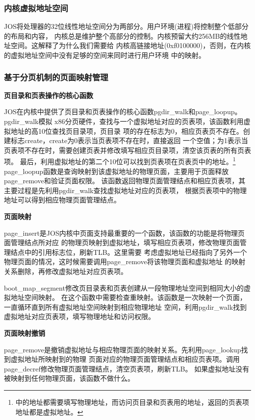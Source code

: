 \documentclass[12pt,openany,a4paper]{report}
\begin{document}
	    \subsubsection{内核虚拟地址空间}
	    JOS将处理器的32位线性地址空间分为两部分。用户环境(进程)将控制整个低部分的布局和内容，
	内核总是维护整个高部分的控制。内核预留大约256MB的线性地址空间。这解释了为什么我们需要给
	内核高链接地址(0xf0100000)，否则，在内核的虚拟地址空间中没有足够的空间来同时进行用户环境
	中的映射。\par
	\subsubsection{基于分页机制的页面映射管理}
	\textbf{页目录和页表操作的核心函数}\par
	    JOS在内核中提供了页目录和页表操作的核心函数pgdir\_walk和page\_loopup。pgdir\_walk模拟
	x86分页硬件，查找与一个虚拟地址对应的页表项，该函数利用虚拟地址的高10位查找页目录项，页目录
	项的存在标志为0，相应页表页不存在。创建标志create，create为0表示当页表项不存在时，直接返回
	一个空值；为1表示当页表项不存在时，需要创建页表并修改填写相应页目录项，清空该页表的所有页表项。
	最后，利用虚拟地址的第二个10位可以找到页表项在页表页中的地址。\footnote{
	中的地址都需要填写物理地址，而访问页目录和页表用的地址，返回的页表项地址都是虚拟地址。}
	page\_loopup函数是查询映射到该虚拟地址的物理页面，主要用于页面释放page\_remove和验证页面权限。
	该函数返回物理页面管理结点和相应页表项，其主要过程是先利用pgdir\_walk查找虚拟地址对应的页表项，
	根据页表项中的物理地址可以得到相应物理页面管理结点。\par
	\textbf{页面映射}\par
	    page\_insert是JOS内核中页面支持最重要的一个函数，该函数的功能是将物理页面管理结点所对应
	的物理页映射到虚拟地址，填写相应页表项，修改物理页面管理结点中的引用标志位，刷新TLB。这里需要
	考虑虚拟地址已经指向了另外一个物理页面的情况，这时候需要调用page\_remove将该物理页面和虚拟地址
	的映射关系删除，再修改虚拟地址对应页表项。\par
	    boot\_map\_segment修改页目录表和页表创建从一段物理地址空间到相同大小的虚拟地址空间映射。
	在这个函数中需要检查重映射。该函数是一次映射一个页面，一直循环直到所有虚拟地址空间映射到相应物理地址
	空间，利用pgdir\_walk找到虚拟地址对应页表项，填写物理地址和访问权限。\par
	\textbf{页面映射撤销}\par
	    page\_remove是撤销虚拟地址与相应物理页面的映射关系。先利用page\_lookup找到虚拟地址所映射到的物理
	页面对应的物理页面管理结点和相应页表项。调用page\_decref修改物理页面管理结点，清空页表项，刷新TLB。
	如果虚拟地址没有被映射到任何物理页面，该函数不做什么。\par
	
\end{document}
